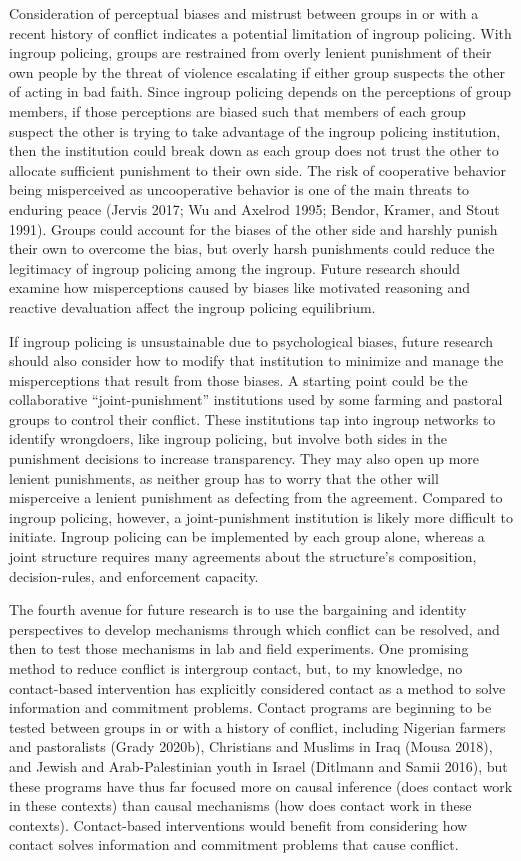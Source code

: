 \documentclass[11pt]{article}
\begin{document}
Consideration of perceptual biases and mistrust between groups in or
with a recent history of conflict indicates a potential limitation of
ingroup policing. With ingroup policing, groups are restrained from
overly lenient punishment of their own people by the threat of violence
escalating if either group suspects the other of acting in bad faith.
Since ingroup policing depends on the perceptions of group members, if
those perceptions are biased such that members of each group suspect the
other is trying to take advantage of the ingroup policing institution,
then the institution could break down as each group does not trust the
other to allocate sufficient punishment to their own side. The risk of
cooperative behavior being misperceived as uncooperative behavior is one
of the main threats to enduring peace (Jervis 2017; Wu and Axelrod 1995;
Bendor, Kramer, and Stout 1991). Groups could account for the biases of
the other side and harshly punish their own to overcome the bias, but
overly harsh punishments could reduce the legitimacy of ingroup policing
among the ingroup. Future research should examine how misperceptions
caused by biases like motivated reasoning and reactive devaluation
affect the ingroup policing equilibrium.

If ingroup policing is unsustainable due to psychological biases, future
research should also consider how to modify that institution to minimize
and manage the misperceptions that result from those biases. A starting
point could be the collaborative ``joint-punishment'' institutions used
by some farming and pastoral groups to control their conflict. These
institutions tap into ingroup networks to identify wrongdoers, like
ingroup policing, but involve both sides in the punishment decisions to
increase transparency. They may also open up more lenient punishments,
as neither group has to worry that the other will misperceive a lenient
punishment as defecting from the agreement. Compared to ingroup
policing, however, a joint-punishment institution is likely more
difficult to initiate. Ingroup policing can be implemented by each group
alone, whereas a joint structure requires many agreements about the
structure's composition, decision-rules, and enforcement capacity.

The fourth avenue for future research is to use the bargaining and
identity perspectives to develop mechanisms through which conflict can
be resolved, and then to test those mechanisms in lab and field
experiments. One promising method to reduce conflict is intergroup
contact, but, to my knowledge, no contact-based intervention has
explicitly considered contact as a method to solve information and
commitment problems. Contact programs are beginning to be tested between
groups in or with a history of conflict, including Nigerian farmers and
pastoralists (Grady 2020b), Christians and Muslims in Iraq (Mousa 2018),
and Jewish and Arab-Palestinian youth in Israel (Ditlmann and Samii
2016), but these programs have thus far focused more on causal inference
(does contact work in these contexts) than causal mechanisms (how does
contact work in these contexts). Contact-based interventions would
benefit from considering how contact solves information and commitment
problems that cause conflict.
\end{document}
